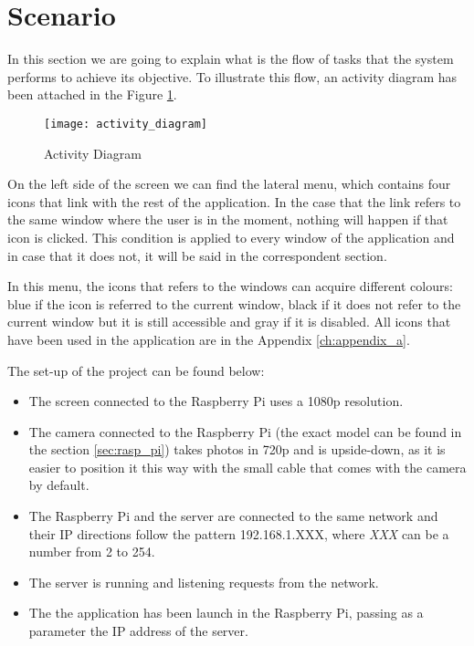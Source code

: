 \section{Scenario}
\label{sec:scenario}

In this section we are going to explain what is the flow of tasks that the system performs to achieve its objective. To illustrate this flow, an activity diagram has been attached in the Figure \ref{fig:activity_diagram}. 

\begin{figure}[!ht]
	\centering
	\texttt{[image: activity\_diagram]}
	\caption{Activity Diagram}
	\label{fig:activity_diagram}
\end{figure}	

On the left side of the screen we can find the lateral menu, which contains four icons that link with the rest of the application. In the case that the link refers to the same window where the user is in the moment, nothing will happen if that icon is clicked. This condition is applied to every window of the application and in case that it does not, it will be said in the correspondent section.

In this menu, the icons that refers to the windows can acquire different colours: blue if the icon is referred to the current window, black if it does not refer to the current window but it is still accessible and gray if it is disabled. All icons that have been used in the application are in the Appendix \ref{ch:appendix_a}.

The set-up of the project can be found below:

\begin{itemize} 
	\item The screen connected to the Raspberry Pi uses a \gls{1080p} resolution.
	\item The camera connected to the Raspberry Pi (the exact model can be found in the section \ref{sec:rasp_pi}) takes photos in \gls{720p} and is upside-down, as it is easier to position it this way with the small cable that comes with the camera by default. 
	\item The Raspberry Pi and the server are connected to the same network and their IP directions follow the pattern 192.168.1.XXX, where \textit{XXX} can be a number from 2 to 254.
	\item The server is running and listening requests from the network.
	\item The the application has been launch in the Raspberry Pi, passing as a parameter the IP address of the server. 
\end{itemize}


